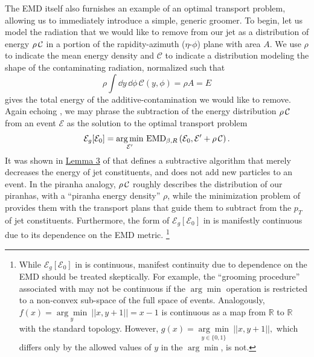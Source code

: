 The EMD itself also furnishes an example of an optimal transport problem, allowing us to immediately introduce a simple, generic \PIRANHA{} groomer.
%
To begin, let us model the radiation that we would like to remove from our jet as a distribution of energy \(\rho\,\mathcal{C}\) in a portion of the rapidity-azimuth (\(\eta\)-\(\phi\)) plane with area \(A\).
%
We use \(\rho\) to indicate the mean energy density and \(\mathcal{C}\) to indicate a distribution modeling the shape of the contaminating radiation, normalized such that
\begin{equation}
    \rho\int \dd y\,\dd\phi\,\mathcal{C}(y,\phi) = \rho A = E
\end{equation}
gives the total energy of the \gls{additive-contamination} we would like to remove.
%
Again echoing , we may phrase the subtraction of the energy distribution \(\rho\,\mathcal{C}\) from an event \(\mathcal{E}\) as the solution to the optimal transport problem
\begin{align}
    \label{eq:simple_piranha}
    \mathcal{E}_g[\mathcal E_0] = \underset{\mathcal{E}'}{\arg \min}\ {\rm EMD}_{\beta, R}
    \left(\mathcal{E}_0, \mathcal{E}' + \rhoC\right)
    .
\end{align}
%
It was shown in \href{https://arxiv.org/pdf/2004.04159.pdf#page=33\&zoom=100,0,0}{Lemma 3} of  that  defines a subtractive algorithm that merely decreases the energy of jet constituents, and does not add new particles to an event.
%
In the piranha analogy, \(\rho\,\mathcal{C}\) roughly describes the distribution of our piranhas, with a ``piranha energy density'' \(\rho\), while the minimization problem of  provides them with the transport plans that guide them to subtract from the \(p_T\) of jet constituents.
%
Furthermore, the form of \(\mathcal{E}_g[\mathcal E_0]\) in  is manifestly continuous due to its dependence on the EMD metric.%
\footnote{
    While \(\mathcal{E}_g[\mathcal E_0]\) in  is continuous, manifest continuity due to dependence on the EMD should be treated skeptically.
    For example, the ``grooming procedure'' associated with   may not be continuous if the \(\arg \min\) operation is restricted to a non-convex sub-space of the full space of events.
    Analogously, \(
        f(x)
        =
        \underset{y}{\arg \min}\ ||x, y+1||
        =
        x-1
    \)
    is continuous as a map from \(\mathbb R\) to \(\mathbb R\) with the standard topology.
    However, \(
        g(x)
        =
        \underset{y \in \{0, 1\}}{\arg \min}\ ||x, y+1||,
    \)
    which differs only by the allowed values of \(y\) in the \(\arg \min\), is not.
}




